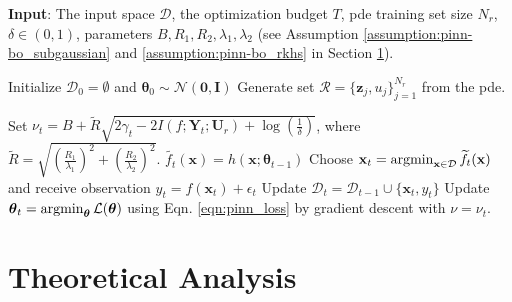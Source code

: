 \begin{algorithm}[!ht]
\caption{Physics-informed Neural Network Black-box Optimization (PINN-BO)}
\label{alg:PINN-BO}
\textbf{Input}: The input space $\mathcal D$, the optimization budget $T$, \ac{pde} training set size $N_r$, $\delta \in (0,1)$, parameters $B, R_1, R_2, \lambda_1, \lambda_2$ (see Assumption \ref{assumption:pinn-bo_subgaussian} and \ref{assumption:pinn-bo_rkhs} in Section \ref{section:pinn-bo_theoretical_analysis}).
\begin{algorithmic}[1]
\State Initialize $\mathcal{D}_0 = \emptyset$ and $\boldsymbol{\theta}_0 \sim \mathcal{N}(\mathbf{0},\mathbf{I})$ 
\State Generate set $\mathcal{R} = \{\mathbf{z}_j, u_j\}_{j=1}^{N_r}$ from the \ac{pde}.

\State Set $\nu_t = B + \widetilde{R} \sqrt{2\gamma_t - 2 I(f; \mathbf{Y}_t; \mathbf{U}_r)  + \log(\frac{1}{\delta})}$, where $\widetilde{R} = \sqrt{\left(\frac{R_1}{\lambda_1}\right)^2 + \left(\frac{R_2}{\lambda_2}\right)^2}$. 
\State $\widetilde{f_t}(\mathbf{x}) = h(\mathbf{x}; \boldsymbol{\theta}_{t-1})$ 
\State Choose $\mathbf{x}_t = \operatorname*{argmin}_{\mathbf{x} \in \mathcal{D}} \widetilde{f_t}(\mathbf{x}) $ and receive observation $y_t = f(\mathbf{x}_t) + \epsilon_t$
\State Update $\mathcal{D}_t = \mathcal{D}_{t-1} \cup \{\mathbf{x}_t, y_t\}$
\State Update $ \boldsymbol{\theta}_t = \operatorname*{argmin}_{\boldsymbol{\theta}} \mathcal{L}(\boldsymbol{\theta})$ using Eqn. \eqref{eqn:pinn_loss} by gradient descent with $\nu = \nu_t$.
\EndFor
\end{algorithmic}
\end{algorithm}


\section{Theoretical Analysis}
\label{section:pinn-bo_theoretical_analysis}

